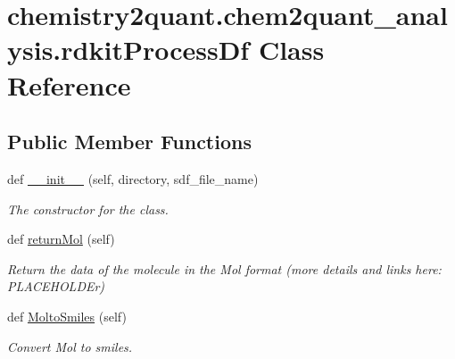 \hypertarget{classchemistry2quant_1_1chem2quant__analysis_1_1rdkitProcessDf}{}\section{chemistry2quant.\+chem2quant\+\_\+analysis.\+rdkit\+Process\+Df Class Reference}
\label{classchemistry2quant_1_1chem2quant__analysis_1_1rdkitProcessDf}
\subsection*{Public Member Functions}
\begin{DoxyCompactItemize}
\item 
\mbox{\label{classchemistry2quant_1_1chem2quant__analysis_1_1rdkitProcessDf_a3f2db3306c1c8c1883cf3af811c539bf}} 
def \hyperlink{classchemistry2quant_1_1chem2quant__analysis_1_1rdkitProcessDf_a3f2db3306c1c8c1883cf3af811c539bf}{\+\_\+\+\_\+init\+\_\+\+\_\+} (self, directory, sdf\+\_\+file\+\_\+name)
\begin{DoxyCompactList}\small\item\em The constructor for the class. \end{DoxyCompactList}\item 
\mbox{\label{classchemistry2quant_1_1chem2quant__analysis_1_1rdkitProcessDf_a63adf77432f5f20cb2e80f8860f67c79}} 
def \hyperlink{classchemistry2quant_1_1chem2quant__analysis_1_1rdkitProcessDf_a63adf77432f5f20cb2e80f8860f67c79}{return\+Mol} (self)
\begin{DoxyCompactList}\small\item\em Return the data of the molecule in the Mol format (more details and links here\+: P\+L\+A\+C\+E\+H\+O\+L\+D\+Er) \end{DoxyCompactList}\item 
\mbox{\label{classchemistry2quant_1_1chem2quant__analysis_1_1rdkitProcessDf_a201597882ae98a081f023159382c7d05}} 
def \hyperlink{classchemistry2quant_1_1chem2quant__analysis_1_1rdkitProcessDf_a201597882ae98a081f023159382c7d05}{Molto\+Smiles} (self)
\begin{DoxyCompactList}\small\item\em Convert Mol to smiles. \end{DoxyCompactList}\item 

\end{DoxyCompactItemize}
